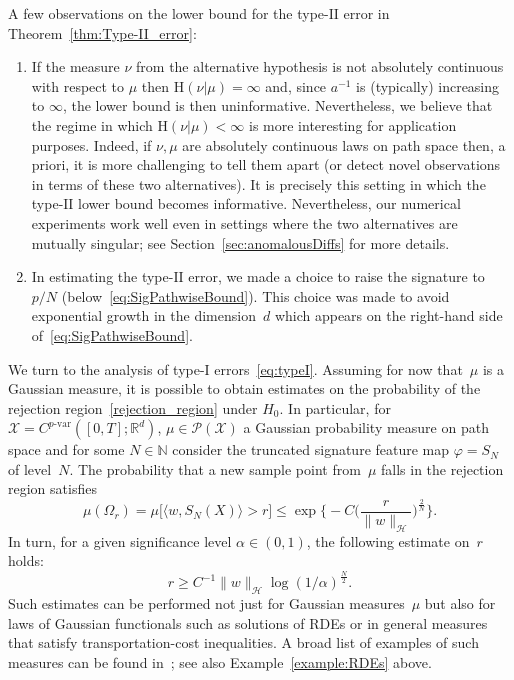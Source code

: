 \documentclass[twoside,11pt]{article}
\numberwithin{equation}{section}
\numberwithin{theorem}{section}
\newcommand{\R}{\mathbb{R}}
\newcommand{\X}{\mathcal{X}}
\newcommand{\N}{\mathbb{N}}
\newcommand{\h}{\mathcal{H}}
\newcommand{\Hent}{\boldsymbol{\mathrm{H}}}
\begin{document}
\begin{remark} A few observations on the lower bound for the type-$\mathrm{II}$ error in Theorem~\ref{thm:Type-II_error}:
\begin{enumerate}
    \item If the measure $\nu$ from the alternative hypothesis is not absolutely continuous with respect to $\mu$ then $\Hent(\nu|\mu)=\infty$ and, since $a^{-1}$ is (typically) increasing to $\infty$, the lower bound is then uninformative. Nevertheless, we believe that the regime in which $\Hent(\nu|\mu)<\infty$ is more interesting for application purposes. Indeed, if $\nu, \mu$ are absolutely continuous laws on path space then, a priori, it is more challenging to tell them apart (or detect novel observations in terms of these two alternatives). It is precisely this setting in which the type-$\mathrm{II}$ lower bound becomes informative. Nevertheless, our numerical experiments work well even in settings where the two alternatives are mutually singular; see Section~\ref{sec:anomalousDiffs} for more details.
    \item In estimating the type-$\mathrm{II}$ error, we made a choice to raise the signature to $p/N$ (below~\eqref{eq:SigPathwiseBound}). This choice was made to avoid exponential growth in the dimension~$d$ which appears on the right-hand side of~\eqref{eq:SigPathwiseBound}.
    \end{enumerate}
\end{remark}


We turn to the analysis of type-$\mathrm{I}$ errors~\eqref{eq:typeI}. 
Assuming for now that~$\mu$ is a Gaussian measure, it is possible to obtain estimates on the probability of the rejection region~\eqref{rejection_region} under $H_0$. In particular, for $\X=C^{p\text{-var}}([0,T];\R^d)$,
$\mu\in\mathscr{P}(\X)$ a Gaussian probability measure on path space and for some $N\in\N$ consider the truncated signature feature map $\varphi=S_N$ of level~$N$.  
The probability that a new sample point from~$\mu$ falls in the rejection region satisfies
$$
\mu\left(\Omega_r\right)
=\mu\bigg[  \langle w,S_N(X)\rangle> r    \bigg]\leq \exp\bigg\{-C\bigg(\frac{r}{\|w\|_{\h}}\bigg)^{\frac{2}{N}}\bigg\}.
$$
In turn, for a given significance level $\alpha\in(0,1)$, the following estimate on~$r$ holds:
$$
r\geq  C^{-1}\|w\|_{\h}\log(1/\alpha)^{\frac{N}{2}}.
$$
Such estimates can be performed not just for Gaussian measures~$\mu$ but also for laws of Gaussian functionals such as solutions of RDEs or in general measures that satisfy transportation-cost inequalities. A broad list of examples of such measures can be found in~\citep{gasteratos2023transportation}; see also Example~\ref{example:RDEs} above. 
\end{document}
